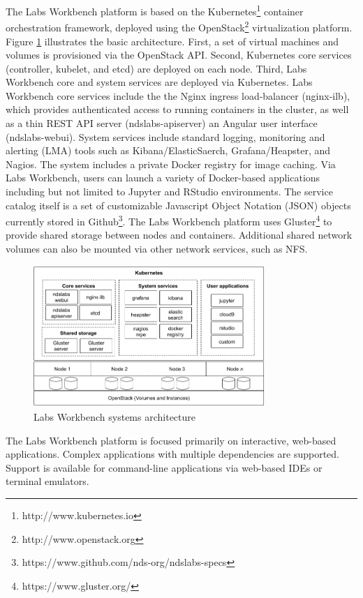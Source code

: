 \documentclass{sig-alternate}
\begin{document}
The Labs Workbench platform is based on the Kubernetes\footnote{http://www.kubernetes.io} container orchestration framework, deployed using the OpenStack\footnote{http://www.openstack.org} virtualization platform. Figure \ref{fig.arch} illustrates the basic architecture. First, a set of virtual machines and volumes is provisioned via the OpenStack API. Second, Kubernetes core services (controller, kubelet, and etcd) are deployed on each node. Third, Labs Workbench core and system services are deployed via Kubernetes. Labs Workbench core services include the the Nginx ingress load-balancer (nginx-ilb), which provides authenticated access to running containers in the cluster, as well as a thin REST API server (ndslabs-apiserver) an Angular user interface (ndslabs-webui). System services include standard logging, monitoring and alerting (LMA) tools such as Kibana/ElasticSaerch, Grafana/Heapster, and Nagios.  The system includes a private Docker registry for image caching.  Via Labs Workbench, users can launch a variety of Docker-based applications including but not limited to Jupyter and RStudio environments. The service catalog itself is a set of customizable Javascript Object Notation (JSON) objects currently stored in Github\footnote{https://www.github.com/nds-org/ndslabs-specs}. The Labs Workbench platform uses Gluster\footnote{https://www.gluster.org/} to provide shared storage between nodes and containers. Additional shared network volumes can also be mounted via other network services, such as NFS.

\begin{figure}[!ht]
\includegraphics[width=8.75cm]{architecture.png}
\caption{Labs Workbench systems architecture}
\label{fig.arch}
\end{figure}

The Labs Workbench platform is focused primarily on interactive, web-based applications.  Complex applications with multiple dependencies are supported. Support is available for command-line applications via web-based IDEs or terminal emulators.  
\end{document}
